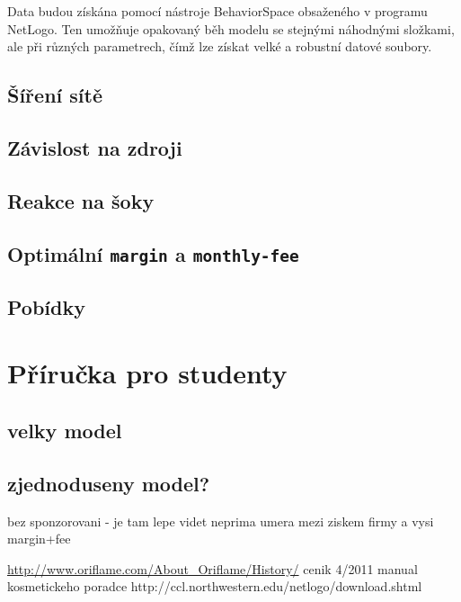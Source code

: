 \documentclass[a4wide,12pt]{report}
\begin{document}
Data budou získána pomocí nástroje BehaviorSpace obsaženého v programu NetLogo. Ten umožňuje opakovaný běh modelu se stejnými náhodnými složkami, ale při různých parametrech, čímž lze získat velké a robustní datové soubory.
\section{Šíření sítě}
\section{Závislost na zdroji}
\section{Reakce na šoky}
\section{Optimální \texttt{margin} a \texttt{monthly-fee}}
\section{Pobídky}
\chapter*{Příručka pro studenty}
\section{velky model}
\section{zjednoduseny model?}
bez sponzorovani - je tam lepe videt neprima umera mezi ziskem firmy a vysi margin+fee
\begin{thebibliography}{9}


\end{thebibliography}
\url{http://www.oriflame.com/About_Oriflame/History/}
cenik 4/2011
manual kosmetickeho poradce
http://ccl.northwestern.edu/netlogo/download.shtml
\end{document}
